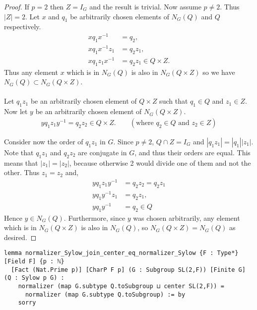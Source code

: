 \begin{proof} 

If $p = 2$ then $Z = I_G$ and the result is trivial. Now assume $p \neq 2$. Thus $|Z| = 2$. Let $x$ and $q_1$ be arbitrarily chosen elements of $N_G(Q)$ and $Q$ respectively.
\begin{align*} xq_1x^{-1} &= q_2, \tag{for some $q_2 \in Q$}
\\ xq_1x^{-1}z_1 &= q_2z_1,
\\ xq_1z_1x^{-1} &= q_2z_1 \in Q \times Z.
\end{align*}
Thus any element $x$ which is in $N_G(Q)$ is also in $N_G(Q \times Z)$ so we have $N_G(Q) \subset N_G(Q \times Z)$. \\
\\
Let $q_1 z_1$ be an arbitrarily chosen element of $Q \times Z$ such that $q_1 \in Q$ and $z_1 \in Z$. Now let $y$ be an arbitrarily chosen element of $N_G(Q \times Z)$.
\begin{align*} y q_1 z_1 y^{-1} = q_2 z_2 \in Q \times Z. \qquad (\text{where $q_2 \in Q$ and $z_2 \in Z$}) 
\end{align*}

Consider now the order of $q_1z_1$ in $G$. Since $p \neq 2$, $Q \cap Z = I_G$ and $|q_1 z_1| = |q_1| |z_1|$. Note that $q_1 z_1$ and $q_2 z_2$ are conjugate in $G$, and thus their orders are equal. This means that $|z_1| = |z_2|$, because otherwise 2 would divide one of them and not the other. Thus $z_1 = z_2$ and,
\begin{align*} y q_1z_1 y^{-1} &=  q_2z_2 = q_2z_1
\\ y q_1 y^{-1} z_1 &= q_2z_1,
\\ y q_1 y^{-1} &= q_2 \in Q
\end{align*}
Hence $y \in N_G(Q)$. Furthermore, since $y$ was chosen arbitrarily, any element which is in $N_G(Q \times Z)$ is also in $N_G(Q)$, so $N_G(Q \times Z) = N_G(Q)$ as desired.

\end{proof}
\begin{footnotesize}
\begin{verbatim}
lemma normalizer_Sylow_join_center_eq_normalizer_Sylow {F : Type*} [Field F] {p : ℕ}
  [Fact (Nat.Prime p)] [CharP F p] (G : Subgroup SL(2,F)) [Finite G] (Q : Sylow p G) :
    normalizer (map G.subtype Q.toSubgroup ⊔ center SL(2,F)) =
      normalizer (map G.subtype Q.toSubgroup) := by
    sorry
\end{verbatim}
\end{footnotesize}

